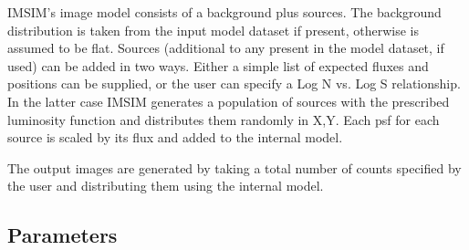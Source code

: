 \documentclass{book}
\renewcommand{\_}{{\tt\char'137}}     %
\begin{document}
IMSIM's image model consists of a background plus sources. The background
distribution is taken from the input model dataset if present, otherwise
is assumed to be flat. Sources (additional to any present in the model
dataset, if used) can be added in two ways. Either a simple list of
expected fluxes and positions can be supplied, or the user can specify
a Log N vs. Log S relationship. In the latter case IMSIM generates a
population of sources with the prescribed luminosity function and
distributes them randomly in X,Y. Each psf for each source is scaled by
its flux and added to the internal model.
 
The output images are generated by taking a total number of counts
specified by the user and distributing them using the internal model.
 
\subsection{Parameters}
\end{document}
